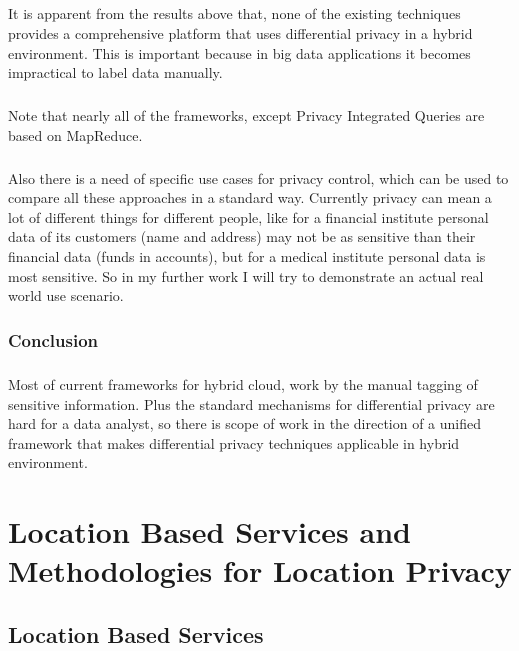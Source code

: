 \documentclass[12pt]{report}
\theoremstyle{named}
\begin{document}
\paragraph{}
It is apparent from the results above that, none of the existing techniques provides a comprehensive platform that uses differential privacy in a hybrid environment. This is important because in big data applications it becomes impractical to label data manually.
\paragraph{}
Note that nearly all of the frameworks, except Privacy Integrated Queries are based on MapReduce.
\paragraph{}
Also there is a need of specific use cases for privacy control, which can be used to compare all these approaches in a standard way. Currently privacy can mean a lot of different things for different people, like for a financial institute personal data of its customers (name and address) may not be as sensitive than their financial data (funds in accounts), but for a medical institute personal data is most sensitive. So in my further work I will try to demonstrate an actual real world use scenario.



\subsection{Conclusion}
\paragraph{}
Most of current frameworks for hybrid cloud, work by the manual tagging of sensitive information. Plus the standard mechanisms for differential privacy are hard for a data analyst, so there is scope of work in the direction of a unified framework that makes differential privacy techniques applicable in hybrid environment. 






\chapter{Location Based Services and Methodologies for Location Privacy}
\label{chap:LocationBasedServices}
\section{Location Based Services}
\end{document}
